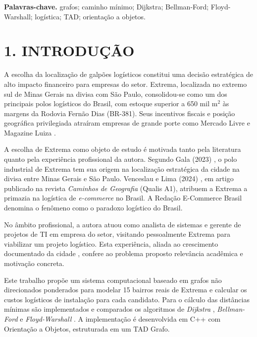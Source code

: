 \documentclass[12pt, a4paper]{article}
\begin{document}
\vspace{0.2cm}
\noindent\textbf{Palavras-chave.} grafos; caminho mínimo; Dijkstra; Bellman-Ford; Floyd-Warshall; logística; TAD; orientação a objetos.

\vspace{0.4cm}

\section*{1. INTRODUÇÃO}

A escolha da localização de galpões logísticos constitui uma decisão estratégica de alto impacto financeiro para empresas do setor. Extrema, localizada no extremo sul de Minas Gerais na divisa com São Paulo, consolidou-se como um dos principais polos logísticos do Brasil, com estoque superior a 650 mil m$^2$ às margens da Rodovia Fernão Dias (BR-381). Seus incentivos fiscais e posição geográfica privilegiada atraíram empresas de grande porte como Mercado Livre e Magazine Luiza \cite{cushman2022, gala2023}.

A escolha de Extrema como objeto de estudo é motivada tanto pela literatura quanto pela experiência profissional da autora. Segundo Gala (2023) \cite{gala2023}, o polo industrial de Extrema tem sua origem na localização estratégica da cidade na divisa entre Minas Gerais e São Paulo. Venceslau e Lima (2024) \cite{venceslau2024}, em artigo publicado na revista \textit{Caminhos de Geografia} (Qualis A1), atribuem a Extrema a primazia na logística de \textit{e-commerce} no Brasil. A Redação E-Commerce Brasil \cite{ecommerce2023} denomina o fenômeno como o paradoxo logístico do Brasil.

No âmbito profissional, a autora atuou como analista de sistemas e gerente de projetos de TI em empresa do setor, visitando pessoalmente Extrema para viabilizar um projeto logístico. Esta experiência, aliada ao crescimento documentado da cidade \cite{cushman2022, gala2023, venceslau2024, ecommerce2023}, confere ao problema proposto relevância acadêmica e motivação concreta.

Este trabalho propõe um sistema computacional baseado em grafos não direcionados ponderados para modelar 15 bairros reais de Extrema e calcular os custos logísticos de instalação para cada candidato. Para o cálculo das distâncias mínimas são implementados e comparados os algoritmos de \textit{Dijkstra} \cite{dijkstra1959}, \textit{Bellman-Ford} \cite{bellman1958} e \textit{Floyd-Warshall} \cite{cormen2009}. A implementação é desenvolvida em C++ com Orientação a Objetos, estruturada em um TAD Grafo.
\end{document}

